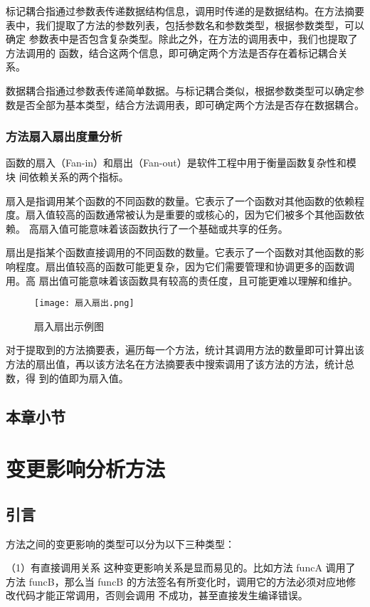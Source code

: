 标记耦合指通过参数表传递数据结构信息，调用时传递的是数据结构。在方法摘要
表中，我们提取了方法的参数列表，包括参数名和参数类型，根据参数类型，可以确定
参数表中是否包含复杂类型。除此之外，在方法的调用表中，我们也提取了方法调用的
函数，结合这两个信息，即可确定两个方法是否存在着标记耦合关系。


数据耦合指通过参数表传递简单数据。与标记耦合类似，根据参数类型可以确定参
数是否全部为基本类型，结合方法调用表，即可确定两个方法是否存在数据耦合。
\subsection{方法扇入扇出度量分析}

函数的扇入（Fan-in）和扇出（Fan-out）是软件工程中用于衡量函数复杂性和模块
间依赖关系的两个指标。


扇入是指调用某个函数的不同函数的数量。它表示了一个函数对其他函数的依赖程
度。扇入值较高的函数通常被认为是重要的或核心的，因为它们被多个其他函数依赖。
高扇入值可能意味着该函数执行了一个基础或共享的任务。


扇出是指某个函数直接调用的不同函数的数量。它表示了一个函数对其他函数的影
响程度。扇出值较高的函数可能更复杂，因为它们需要管理和协调更多的函数调用。高
扇出值可能意味着该函数具有较高的责任度，且可能更难以理解和维护。

\begin{figure}[h]
\centering
\texttt{[image: 扇入扇出.png]}
\caption{扇入扇出示例图}
\end{figure}

对于提取到的方法摘要表，遍历每一个方法，统计其调用方法的数量即可计算出该
方法的扇出值，再以该方法名在方法摘要表中搜索调用了该方法的方法，统计总数，得
到的值即为扇入值。

\section{本章小节}

\chapter{变更影响分析方法}
\section{引言}
方法之间的变更影响的类型可以分为以下三种类型：

（1）有直接调用关系
这种变更影响关系是显而易见的。比如方法 funcA 调用了方法 funcB，那么当 funcB
的方法签名有所变化时，调用它的方法必须对应地修改代码才能正常调用，否则会调用
不成功，甚至直接发生编译错误。

